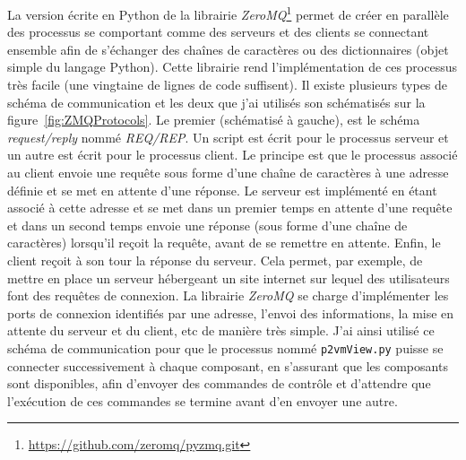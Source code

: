 La version écrite en Python de la librairie \textit{ZeroMQ}\footnote{\url{https://github.com/zeromq/pyzmq.git}} permet de créer en parallèle des processus se comportant comme des serveurs et des clients se connectant ensemble afin de s'échanger des chaînes de caractères ou des dictionnaires (objet simple du langage Python). Cette librairie rend l'implémentation de ces processus très facile (une vingtaine de lignes de code suffisent). Il existe plusieurs types de schéma de communication et les deux que j'ai utilisés son schématisés sur la figure~\ref{fig:ZMQProtocols}. Le premier (schématisé à gauche), est le schéma \textit{request/reply} nommé \textit{REQ/REP}. Un script est écrit pour le processus serveur et un autre est écrit pour le processus client. Le principe est que le processus associé au client envoie une requête sous forme d'une chaîne de caractères à une adresse définie et se met en attente d'une réponse. Le serveur est implémenté en étant associé à cette adresse et se met dans un premier temps en attente d'une requête et dans un second temps envoie une réponse (sous forme d'une chaîne de caractères) lorsqu'il reçoit la requête, avant de se remettre en attente. Enfin, le client reçoit à son tour la réponse du serveur. Cela permet, par exemple, de mettre en place un serveur hébergeant un site internet sur lequel des utilisateurs font des requêtes de connexion. La librairie \textit{ZeroMQ} se charge d'implémenter les ports de connexion identifiés par une adresse, l'envoi des informations, la mise en attente du serveur et du client, etc de manière très simple. J'ai ainsi utilisé ce schéma de communication pour que le processus nommé \texttt{p2vmView.py} puisse se connecter successivement à chaque composant, en s'assurant que les composants sont disponibles, afin d'envoyer des commandes de contrôle et d'attendre que l'exécution de ces commandes se termine avant d'en envoyer une autre.

